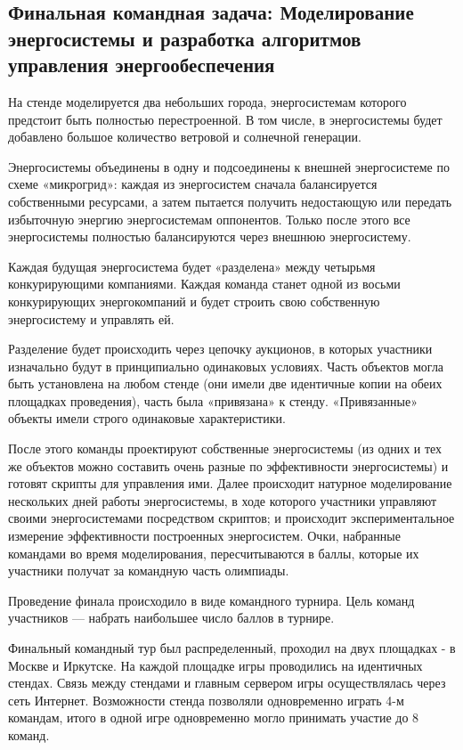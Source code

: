 \subsection*{Финальная командная задача: Моделирование энергосистемы и разработка алгоритмов управления энергообеспечения}

На стенде моделируется два небольших города, энергосистемам которого предстоит быть полностью перестроенной. В том числе, в энергосистемы будет добавлено большое количество ветровой и солнечной генерации.

Энергосистемы объединены в одну и подсоединены к внешней энергосистеме по схеме «микрогрид»: каждая из энергосистем сначала балансируется собственными ресурсами, а затем пытается получить недостающую или передать избыточную энергию энергосистемам оппонентов. Только после этого все энергосистемы полностью балансируются через внешнюю энергосистему.

Каждая будущая энергосистема будет «разделена» между четырьмя конкурирующими компаниями. Каждая команда станет одной из восьми конкурирующих энергокомпаний и будет строить свою собственную энергосистему и управлять ей.

Разделение будет происходить через цепочку аукционов, в которых участники изначально будут в принципиально одинаковых условиях. Часть объектов могла быть установлена на любом стенде (они имели две идентичные копии на обеих площадках проведения), часть была «привязана» к стенду. «Привязанные» объекты имели строго одинаковые характеристики.

После этого команды проектируют собственные энергосистемы (из одних и тех же объектов можно составить очень разные по эффективности энергосистемы) и готовят скрипты для управления ими. Далее происходит натурное моделирование нескольких дней работы энергосистемы, в ходе которого участники управляют своими энергосистемами посредством скриптов; и происходит экспериментальное измерение эффективности построенных энергосистем. Очки, набранные командами во время моделирования, пересчитываются в баллы, которые их участники получат за командную часть олимпиады.

Проведение финала происходило в виде командного турнира. Цель команд участников — набрать наибольшее число баллов в турнире.

Финальный командный тур был распределенный, проходил на двух площадках - в Москве и Иркутске. На каждой площадке игры проводились на идентичных стендах. Связь между стендами и главным сервером игры осуществлялась через сеть Интернет. Возможности стенда позволяли одновременно играть 4-м командам, итого в одной игре одновременно могло принимать участие до 8 команд.

